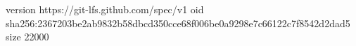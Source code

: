 version https://git-lfs.github.com/spec/v1
oid sha256:2367203be2ab9832b58dbcd350cce68f006be0a9298e7c66122c7f8542d2dad5
size 22000
